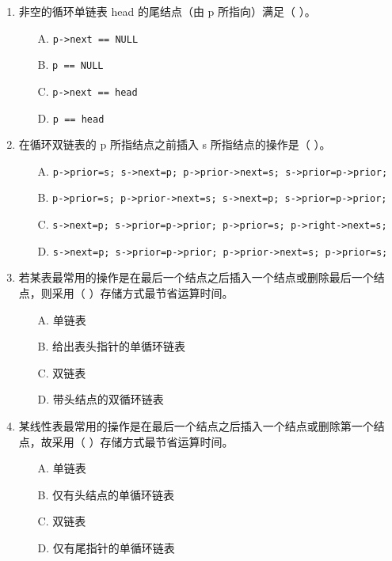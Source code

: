 \documentclass[12pt, a4paper]{article}
\begin{document}
\begin{enumerate}
    \item 非空的循环单链表 head 的尾结点（由 p 所指向）满足（ ）。
    \begin{enumerate}
        \item[A.] \texttt{p->next == NULL}
        \item[B.] \texttt{p == NULL}
        \item[C.] \texttt{p->next == head}
        \item[D.] \texttt{p == head}
    \end{enumerate}
    
    \item 在循环双链表的 p 所指结点之前插入 s 所指结点的操作是（ ）。
    \begin{enumerate}
        \item[A.] \texttt{p->prior=s; s->next=p; p->prior->next=s; s->prior=p->prior;}
        \item[B.] \texttt{p->prior=s; p->prior->next=s; s->next=p; s->prior=p->prior;}
        \item[C.] \texttt{s->next=p; s->prior=p->prior; p->prior=s; p->right->next=s;}
        \item[D.] \texttt{s->next=p; s->prior=p->prior; p->prior->next=s; p->prior=s;}
    \end{enumerate}
    
    \item 若某表最常用的操作是在最后一个结点之后插入一个结点或删除最后一个结点，则采用（ ）存储方式最节省运算时间。
    \begin{enumerate}
        \item[A.] 单链表
        \item[B.] 给出表头指针的单循环链表
        \item[C.] 双链表
        \item[D.] 带头结点的双循环链表
    \end{enumerate}
    
    \item 某线性表最常用的操作是在最后一个结点之后插入一个结点或删除第一个结点，故采用（ ）存储方式最节省运算时间。
    \begin{enumerate}
        \item[A.] 单链表
        \item[B.] 仅有头结点的单循环链表
        \item[C.] 双链表
        \item[D.] 仅有尾指针的单循环链表
    \end{enumerate}
    

\end{enumerate}
\end{document}
